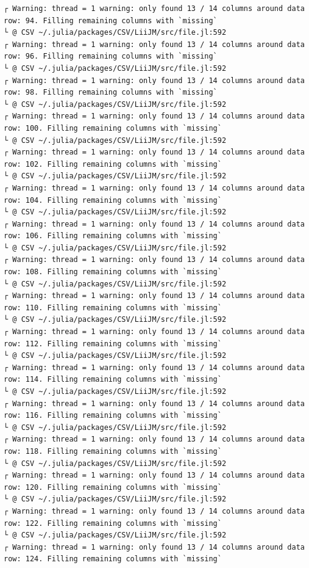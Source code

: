\documentclass[
  letterpaper,
  DIV=11,
  numbers=noendperiod]{scrartcl}
\begin{document}
\begin{verbatim}
┌ Warning: thread = 1 warning: only found 13 / 14 columns around data row: 94. Filling remaining columns with `missing`
└ @ CSV ~/.julia/packages/CSV/LiiJM/src/file.jl:592
┌ Warning: thread = 1 warning: only found 13 / 14 columns around data row: 96. Filling remaining columns with `missing`
└ @ CSV ~/.julia/packages/CSV/LiiJM/src/file.jl:592
┌ Warning: thread = 1 warning: only found 13 / 14 columns around data row: 98. Filling remaining columns with `missing`
└ @ CSV ~/.julia/packages/CSV/LiiJM/src/file.jl:592
┌ Warning: thread = 1 warning: only found 13 / 14 columns around data row: 100. Filling remaining columns with `missing`
└ @ CSV ~/.julia/packages/CSV/LiiJM/src/file.jl:592
┌ Warning: thread = 1 warning: only found 13 / 14 columns around data row: 102. Filling remaining columns with `missing`
└ @ CSV ~/.julia/packages/CSV/LiiJM/src/file.jl:592
┌ Warning: thread = 1 warning: only found 13 / 14 columns around data row: 104. Filling remaining columns with `missing`
└ @ CSV ~/.julia/packages/CSV/LiiJM/src/file.jl:592
┌ Warning: thread = 1 warning: only found 13 / 14 columns around data row: 106. Filling remaining columns with `missing`
└ @ CSV ~/.julia/packages/CSV/LiiJM/src/file.jl:592
┌ Warning: thread = 1 warning: only found 13 / 14 columns around data row: 108. Filling remaining columns with `missing`
└ @ CSV ~/.julia/packages/CSV/LiiJM/src/file.jl:592
┌ Warning: thread = 1 warning: only found 13 / 14 columns around data row: 110. Filling remaining columns with `missing`
└ @ CSV ~/.julia/packages/CSV/LiiJM/src/file.jl:592
┌ Warning: thread = 1 warning: only found 13 / 14 columns around data row: 112. Filling remaining columns with `missing`
└ @ CSV ~/.julia/packages/CSV/LiiJM/src/file.jl:592
┌ Warning: thread = 1 warning: only found 13 / 14 columns around data row: 114. Filling remaining columns with `missing`
└ @ CSV ~/.julia/packages/CSV/LiiJM/src/file.jl:592
┌ Warning: thread = 1 warning: only found 13 / 14 columns around data row: 116. Filling remaining columns with `missing`
└ @ CSV ~/.julia/packages/CSV/LiiJM/src/file.jl:592
┌ Warning: thread = 1 warning: only found 13 / 14 columns around data row: 118. Filling remaining columns with `missing`
└ @ CSV ~/.julia/packages/CSV/LiiJM/src/file.jl:592
┌ Warning: thread = 1 warning: only found 13 / 14 columns around data row: 120. Filling remaining columns with `missing`
└ @ CSV ~/.julia/packages/CSV/LiiJM/src/file.jl:592
┌ Warning: thread = 1 warning: only found 13 / 14 columns around data row: 122. Filling remaining columns with `missing`
└ @ CSV ~/.julia/packages/CSV/LiiJM/src/file.jl:592
┌ Warning: thread = 1 warning: only found 13 / 14 columns around data row: 124. Filling remaining columns with `missing`

\end{verbatim}
\end{document}
